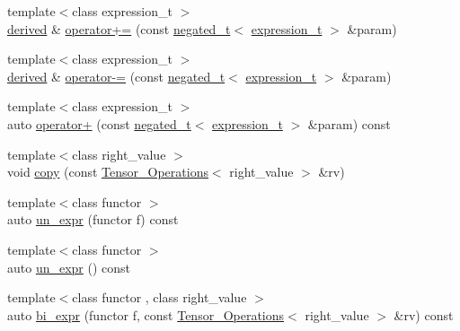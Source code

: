 \begin{DoxyCompactItemize}
{\footnotesize template$<$class expression\+\_\+t $>$ }\\\hyperlink{structBC_1_1tensors_1_1Tensor__Operations_a830b9a11262226b18af9caef7b9da13b}{derived} \& \hyperlink{structBC_1_1tensors_1_1Tensor__Operations_ac9e54c8dcf66d4ad2341bdea938bae60}{operator+=} (const \hyperlink{classBC_1_1tensors_1_1Tensor__Base}{negated\+\_\+t}$<$ \hyperlink{structBC_1_1tensors_1_1Tensor__Operations_a963cb506586200de946d7f3c9a02c56d}{expression\+\_\+t} $>$ \&param)
\item 
{\footnotesize template$<$class expression\+\_\+t $>$ }\\\hyperlink{structBC_1_1tensors_1_1Tensor__Operations_a830b9a11262226b18af9caef7b9da13b}{derived} \& \hyperlink{structBC_1_1tensors_1_1Tensor__Operations_a3ea33bbe36095e3106f09ed105e709c8}{operator-\/=} (const \hyperlink{classBC_1_1tensors_1_1Tensor__Base}{negated\+\_\+t}$<$ \hyperlink{structBC_1_1tensors_1_1Tensor__Operations_a963cb506586200de946d7f3c9a02c56d}{expression\+\_\+t} $>$ \&param)
\item 
{\footnotesize template$<$class expression\+\_\+t $>$ }\\auto \hyperlink{structBC_1_1tensors_1_1Tensor__Operations_a5542fc23f64610d56de924df4aa82410}{operator+} (const \hyperlink{classBC_1_1tensors_1_1Tensor__Base}{negated\+\_\+t}$<$ \hyperlink{structBC_1_1tensors_1_1Tensor__Operations_a963cb506586200de946d7f3c9a02c56d}{expression\+\_\+t} $>$ \&param) const 
\item 
{\footnotesize template$<$class right\+\_\+value $>$ }\\void \hyperlink{structBC_1_1tensors_1_1Tensor__Operations_a09ee84a69572ab98aab3d4b758c000f2}{copy} (const \hyperlink{structBC_1_1tensors_1_1Tensor__Operations}{Tensor\+\_\+\+Operations}$<$ right\+\_\+value $>$ \&rv)
\item 
{\footnotesize template$<$class functor $>$ }\\auto \hyperlink{structBC_1_1tensors_1_1Tensor__Operations_a0513f47543ce68bdc514c9c6f28ec2ed}{un\+\_\+expr} (functor f) const 
\item 
{\footnotesize template$<$class functor $>$ }\\auto \hyperlink{structBC_1_1tensors_1_1Tensor__Operations_a28995965a91a6cdfde1ff40d744766c3}{un\+\_\+expr} () const 
\item 
{\footnotesize template$<$class functor , class right\+\_\+value $>$ }\\auto \hyperlink{structBC_1_1tensors_1_1Tensor__Operations_a6c5d65a88c7c501c19262e6ab9582474}{bi\+\_\+expr} (functor f, const \hyperlink{structBC_1_1tensors_1_1Tensor__Operations}{Tensor\+\_\+\+Operations}$<$ right\+\_\+value $>$ \&rv) const 

\end{DoxyCompactItemize}
